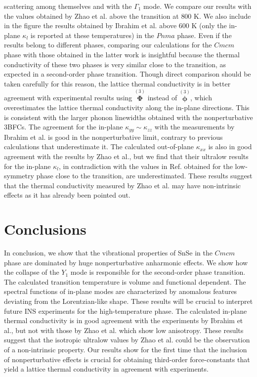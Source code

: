 scattering among themselves and with the $\Gamma_1$ mode. We compare our results with the values obtained by Zhao et al.\cite{zhao2014ultralow} above the transition at $800$ K. We also include in the figure the results 
obtained by Ibrahim et al.\cite{ibrahim2017reinvestigation} above $600$ K (only the in-plane $\kappa_l$ is reported at these temperatures) in the $Pnma$ phase. Even if the results belong to different phases, comparing our 
calculations for the $Cmcm$ phase with those obtained in the latter work is insightful because the thermal conductivity of these two phases is very similar close to the transition, as expected in a second-order phase 
transition. Though direct comparison should be taken carefully for this reason, the lattice thermal conductivity is in better agreement with experimental results using $\overset{(3)}{\boldsymbol{\Phi}}$ instead 
of $\overset{(3)}{\boldsymbol{\phi}}$, which overestimates the lattice thermal conductivity along the in-plane directions. This is consistent with the larger phonon linewidths obtained with the nonperturbative 3BFCs. The 
agreement for the in-plane $\kappa_{yy} \sim \kappa_{zz}$ with the measurements by Ibrahim et al.\cite{ibrahim2017reinvestigation} is good in the nonperturbative limit, contrary to previous calculations that 
underestimate it\cite{skelton2016anharmonicity}. The calculated out-of-plane $\kappa_{xx}$ is also in good agreement with the results by Zhao et al.\cite{zhao2014ultralow}, but we find that their ultralow results for the 
in-plane $\kappa_l$, in contradiction with the values in Ref. \cite{ibrahim2017reinvestigation} obtained for the low-symmetry phase close to the transition, are underestimated. These results suggest that the thermal 
conductivity measured by Zhao et al. may have non-intrinsic effects as it has already been pointed out\cite{wei2016intrinsic}.

\section{Conclusions}

In conclusion, we show that the vibrational properties of SnSe in the $Cmcm$ phase are dominated by huge nonperturbative anharmonic effects. We show how the collapse of the $Y_1$ mode is responsible for the second-order 
phase transition. The calculated transition temperature is volume and functional dependent. The spectral functions of in-plane modes are characterized by anomalous features deviating from the Lorentzian-like shape. These 
results will be crucial to interpret future INS experiments for the high-temperature phase. The calculated in-plane thermal conductivity is in good agreement with the experiments by Ibrahim et 
al.\cite{ibrahim2017reinvestigation}, but not with those by Zhao et al.\cite{zhao2014ultralow} which show low anisotropy. These results suggest that the isotropic ultralow values by Zhao et al. could be the observation of a 
non-intrinsic property. Our results show for the first time that the inclusion of nonperturbative effects is crucial for obtaining third-order force-constants that yield a lattice thermal conductivity in agreement with experiments.
